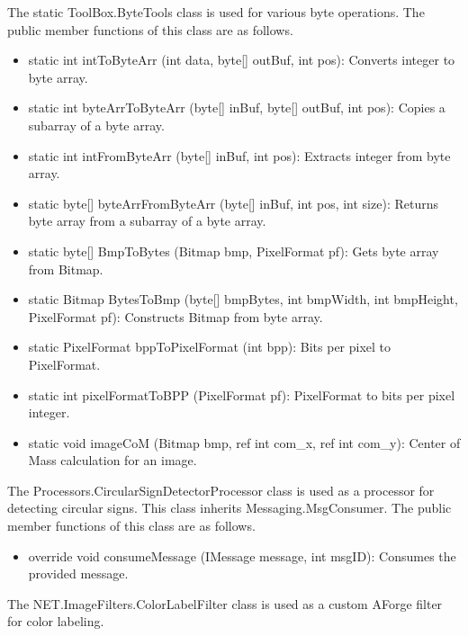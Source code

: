\documentclass[a4paper,oneside,12pt]{report}
\begin{document}
The static ToolBox.ByteTools class is used for various byte operations. 
The public member functions of this class are as follows.
\begin{itemize}
\item static int intToByteArr (int data, byte[] outBuf, int pos): Converts integer to byte array. 
\item static int byteArrToByteArr (byte[] inBuf, byte[] outBuf, int pos): Copies a subarray of a byte array. 
\item static int intFromByteArr (byte[] inBuf, int pos): Extracts integer from byte array. 
\item static byte[] byteArrFromByteArr (byte[] inBuf, int pos, int size): Returns byte array from a subarray of a byte array. 
\item static byte[] BmpToBytes (Bitmap bmp, PixelFormat pf): Gets byte array from Bitmap. 
\item static Bitmap BytesToBmp (byte[] bmpBytes, int bmpWidth, int bmpHeight, PixelFormat pf): Constructs Bitmap from byte array. 
\item static PixelFormat bppToPixelFormat (int bpp): Bits per pixel to PixelFormat. 
\item static int pixelFormatToBPP (PixelFormat pf): PixelFormat to bits per pixel integer. 
\item static void imageCoM (Bitmap bmp, ref int com\_x, ref int com\_y): Center of Mass calculation for an image. 
\end{itemize}

The Processors.CircularSignDetectorProcessor class is used as a processor for detecting circular signs.
This class inherits Messaging.MsgConsumer. The public member functions of this class are as follows.
\begin{itemize}
\item override void consumeMessage (IMessage message, int msgID): Consumes the provided message. 
\end{itemize}

The NET.ImageFilters.ColorLabelFilter class is used as a custom AForge filter for color labeling.  
\end{document}
